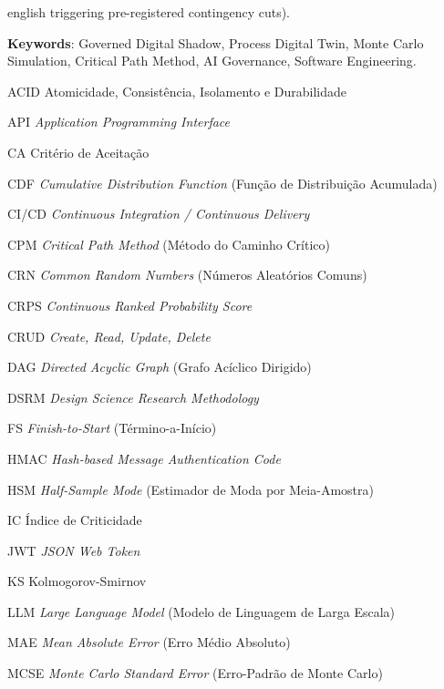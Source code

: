 \documentclass[12pt,openany,oneside,a4paper,english,brazilian,sumario=tradicional]{abntex2}
\begin{document}
\begin{resumo}[Abstract]
\begin{otherlanguage*}{english}
triggering pre-registered contingency cuts).

\textbf{Keywords}: Governed Digital Shadow, Process Digital Twin, Monte Carlo Simulation, Critical Path Method, AI Governance, Software Engineering.
\end{otherlanguage*}
\end{resumo}

\listoffigures*
\cleardoublepage
{}
\listoftables*
\cleardoublepage

\begin{siglas}
  \item[ACID] Atomicidade, Consistência, Isolamento e Durabilidade
  \item[API] \textit{Application Programming Interface}
  \item[CA] Critério de Aceitação
  \item[CDF] \textit{Cumulative Distribution Function} (Função de Distribuição Acumulada)
  \item[CI/CD] \textit{Continuous Integration / Continuous Delivery}
  \item[CPM] \textit{Critical Path Method} (Método do Caminho Crítico)
  \item[CRN] \textit{Common Random Numbers} (Números Aleatórios Comuns)
  \item[CRPS] \textit{Continuous Ranked Probability Score}
  \item[CRUD] \textit{Create, Read, Update, Delete}
  \item[DAG] \textit{Directed Acyclic Graph} (Grafo Acíclico Dirigido)
  \item[DSRM] \textit{Design Science Research Methodology}
  \item[FS] \textit{Finish-to-Start} (Término-a-Início)
  \item[HMAC] \textit{Hash-based Message Authentication Code}
  \item[HSM] \textit{Half-Sample Mode} (Estimador de Moda por Meia-Amostra)
  \item[IC] Índice de Criticidade
  \item[JWT] \textit{JSON Web Token}
  \item[KS] Kolmogorov-Smirnov
  \item[LLM] \textit{Large Language Model} (Modelo de Linguagem de Larga Escala)
  \item[MAE] \textit{Mean Absolute Error} (Erro Médio Absoluto)
  \item[MCSE] \textit{Monte Carlo Standard Error} (Erro-Padrão de Monte Carlo)

\end{siglas}
\end{document}

